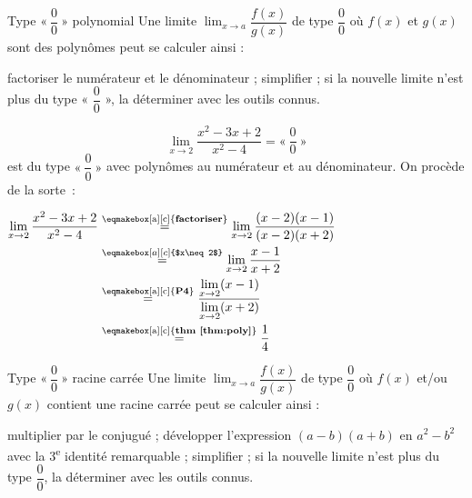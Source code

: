 \documentclass[a4paper,12pt]{article}
\begin{document}
\begin{methode}
	Type $«~\dfrac{0}{0}~»$ polynomial
	\tcblower
Une limite \(\displaystyle\lim_{x\to a}\dfrac{f(x)}{g(x)}\) de type \(\displaystyle\dfrac{0}{0}\) où \(f(x)\) et \(g(x)\) sont des polynômes peut se calculer ainsi :
\begin{tasks}
	\task factoriser le numérateur et le dénominateur ;
	\task simplifier ; 
	\task si la nouvelle limite n’est plus du type «  \(\displaystyle\dfrac{0}{0}\) », la déterminer avec les outils connus.
\end{tasks}
\end{methode}
\begin{exemple}
\tcblower

\[
\lim_{x\to2}\dfrac{x^2-3x+2}{x^2-4}
=«~\dfrac{0}{0}~»\]
est du type $«~\dfrac{0}{0}~»$ avec polynômes au numérateur et au dénominateur. On procède de la sorte~:

$
\begin{aligned}
\lim_{x\to2}\dfrac{x^2-3x+2}{x^2-4}
&\stackrel{\text{\eqmakebox[a][c]{{\bfseries factoriser}}}}{=}
\lim_{x\to2}\dfrac{(x-2)(x-1)}{(x-2)(x+2)}\\
&\stackrel{\eqmakebox[a][c]{$x\neq2$}}{=}
\lim_{x\to2}\dfrac{x-1}{x+2}\\
&\stackrel{\text{\eqmakebox[a][c]{{\bfseries P4}}}}{=}
		  \displaystyle{		  \dfrac{\displaystyle{\lim_{x\to2}(x-1)}}{\displaystyle{\lim_{x\to2}(x+2)}}}\\
&\stackrel{\text{\eqmakebox[a][c]{{\bfseries thm \ref{thm:poly}}}}}{=}
\dfrac{1}{4}
\end{aligned}$
\end{exemple}

\begin{methode}
	Type $«~\dfrac{0}{0}~»$ racine carrée
	\tcblower
Une limite \(\displaystyle\lim_{x\to a}\dfrac{f(x)}{g(x)}\) de type \(\displaystyle\dfrac{0}{0}\) où \(f(x)\) et/ou \(g(x)\) contient une racine carrée peut se calculer ainsi :
\begin{tasks}
\task multiplier par le conjugué ;
\task développer l'expression \((a - b)(a + b)\) en \(a^2 - b^2\) avec la 3\textsuperscript{e} identité remarquable ;
\task simplifier ;
\task  si la nouvelle limite n’est plus du type \(\displaystyle\dfrac{0}{0}\), la déterminer avec les outils connus.
\end{tasks}
\end{methode}
\end{document}
